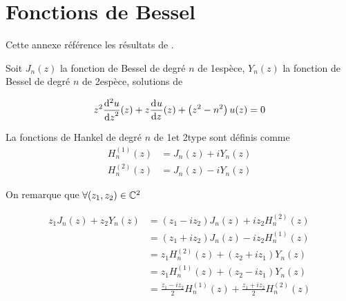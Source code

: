 \section{Fonctions de Bessel}

Cette annexe référence les résultats de \cite{abramowitz_handbook_1964}.

Soit \(J_n(z)\) la fonction de Bessel de degré \(n\) de 1\iere espèce, \(Y_n(z)\) la fonction de Bessel de degré \(n\) de 2\ieme espèce, solutions de

\begin{equation}
    z^2 \ddp[2]{z}{u}(z) + z\ddp{z}{u}(z)+\left(z^2-n^2\right)u(z) = 0
\end{equation}

La fonctions de Hankel de degré \(n\) de 1\iere et 2\ieme type sont définis comme
\begin{align}
    H_n^{(1)}(z) &= J_n(z) + iY_n(z)\\
    H_n^{(2)}(z) &= J_n(z) - iY_n(z)
\end{align}

On remarque que \(\forall (z_1,z_2) \in \CC^2\)

\begin{equation}
\begin{aligned}
z_1 J_n(z) + z_2 Y_n(z)
&= ( z_1 - i z_2 ) J_n(z) + iz_2 H_n^{(2)}(z) \\
&= ( z_1 + i z_2 ) J_n(z) - iz_2 H_n^{(1)}(z) \\
&= z_1 H_n^{(2)}(z) + ( z_2 + i z_1 ) Y_n(z) \\
&= z_1 H_n^{(1)}(z) + ( z_2 - i z_1 ) Y_n(z) \\
&= \frac{z_1-iz_2}{2}H_n^{(1)}(z) + \frac{z_1+iz_2}{2}H_n^{(2)}(z)
\end{aligned}
\label{eq:annex:bessel:equiv_bessel}
\end{equation}